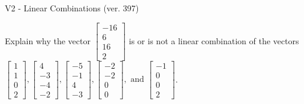 \begin{exercise}
  \begin{exerciseTitle}V2 - Linear Combinations (ver. 397)\end{exerciseTitle}
  \begin{exerciseStatement}
    Explain why the vector \(\left[\begin{array}{c}
-16 \\
6 \\
16 \\
2
\end{array}\right]\)  is or is not a linear 
	combination of the vectors \(\left[\begin{array}{c}
1 \\
1 \\
0 \\
2
\end{array}\right] , \left[\begin{array}{c}
4 \\
-3 \\
-4 \\
-2
\end{array}\right] , \left[\begin{array}{c}
-5 \\
-1 \\
4 \\
-3
\end{array}\right] , \left[\begin{array}{c}
-2 \\
-2 \\
0 \\
0
\end{array}\right] , \text{ and } \left[\begin{array}{c}
-1 \\
0 \\
0 \\
2
\end{array}\right]\).
	



\end{exerciseStatement}
\end{exercise}

